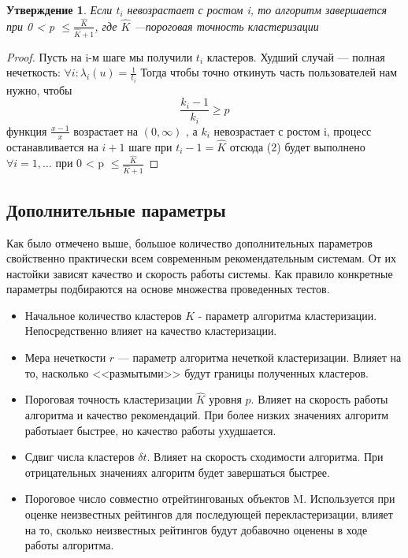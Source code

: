 \documentclass[a4paper, 12pt]{article} %
\newtheorem{statement}{Утверждение}
\begin{document}
\begin{statement}
Если $t_{i} $ невозрастает с ростом i, то алгоритм завершается при   0 < p $\leq \frac {\hat{K}}{\hat{K}+1}$, где $\hat{K}$ ---пороговая точность кластеризации
\end{statement}
\begin{proof}

Пусть на i-м шаге мы получили $t_{i}$ кластеров. 
Худший случай --- полная нечеткость: $\forall i: \lambda_{i}(u) = \frac{1}{t_{i}}$
Тогда чтобы точно откинуть часть пользователей нам нужно, чтобы 
\begin{equation}
	\frac{k_{i} - 1}{k_{i}} \geq p
\end{equation}
функция $\frac{x-1}{x}$ возрастает на $(0, \infty)$ , а $k_{i} $ невозрастает с ростом i, процесс останавливается на $i+1$ шаге при $t_{i} - 1=\hat{K}$ отсюда (2) будет выполнено $\forall i = 1,\dots$ при 0 < p $\leq \frac {\hat{K}}{\hat{K}+1}$
\end{proof}

\subsection{Дополнительные параметры}

Как было отмечено выше, большое количество дополнительных параметров свойственно практически всем современным рекомендательным системам. От их настойки зависят качество и скорость работы системы. Как правило конкретные параметры подбираются на основе множества проведенных тестов. 

\begin{itemize}
\item Начальное количество кластеров $K$ - параметр алгоритма кластеризации. Непосредственно влияет на качество кластеризации. 
\item Мера нечеткости $r$ --- параметр алгоритма нечеткой кластеризации. Влияет на то, насколько <<размытыми>> будут границы полученных кластеров.
\item Пороговая точность кластеризации $\hat{K}$ уровня $p$. Влияет на скорость работы алгоритма и качество рекомендаций. При более низких значениях алгоритм работыает быстрее, но качество работы ухудшается.
\item Сдвиг числа кластеров $\delta t$. Влияет на скорость сходимости алгоритма. При отрицательных значениях алгоритм будет завершаться быстрее.
\item Пороговое число совместно отрейтингованых объектов M. Используется при оценке неизвестных рейтингов для последующей перекластеризации, влияет на то, сколько неизвестных рейтингов будут добавочно оценены в ходе работы алгоритма\cite{itercf}.

\end{itemize}
\end{document}
